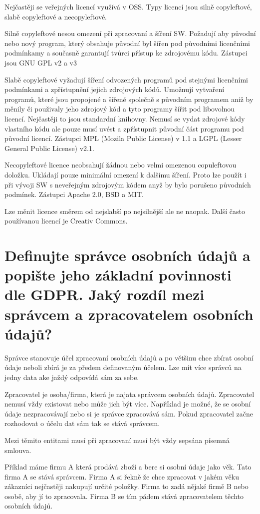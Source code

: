 \documentclass[12pt,a4paper,czech]{article}
\newcommand{\nadpis}[1]{{\section{#1}}}
\begin{document}
Nejčastěji se veřejných licencí využívá v OSS. Typy licencí jsou silně copyleftové, slabě copyleftové a necopyleftové.

Silně copyleftové nesou omezení při zpracovaní a šíření SW. Požadují aby původní nebo nový program, který obsahuje původní byl šířen pod původními licenčními podmínkamy a současně garantují tvůrci přístup ke zdrojovému kódu. Zástupci jsou GNU GPL v2 a v3

Slabě copyleftové vyžadují šíření odvozených programů pod stejnými licenčními podmínkami a zpřístupnění jejich zdrojových kódů. Umožnují vytvaření programů, které jsou propojené a šířené společně s původním programem aniž by měnily či použivaly jeho zdrojový kód a tyto programy šířit pod libovolnou licencí. Nejčastěji to jsou standardní knihovny. Nemusí se vydat zdrojové kódy vlastního kódu ale pouze musí uvést a zpřístupnit původní část programu pod původní licencí. Zástupci MPL (Mozila Public License) v 1.1 a  LGPL (Lesser General Public License) v2.1.

Necopyleftové licence neobsahují žádnou nebo velmi omezenou copuleftovou doložku. Ukládají pouze minimální omezení k dalšímu šíření. Proto lze použít i při vývoji SW s neveřejným zdrojovým kódem anyž by bylo porušeno původních podmínek. Zástupci Apache 2.0, BSD a MIT.

Lze měnit licence směrem od nejslabší po nejsilnější ale ne naopak. Další často používanou licencí je Creativ Commons.


\vspace{0.5cm} 
\nadpis{Definujte správce osobních údajů a popište jeho základní povinnosti dle GDPR. Jaký rozdíl mezi správcem a zpracovatelem osobních údajů?}

Správce stanovuje účel zpracovaní osobních údajů a po většinu chce zbírat osobní údaje neboli zbírá je za předem definovaným účelem. Lze mít více správců na jedny data ake jaždý odpovídá sám za sebe.

Zpracovatel je osoba/firma, která je najata správcem osobních údajů. Zpracovatel nemusí vždy existovat nebo může jich být více. Například je možné, že se osobní údaje nezpracovávají nebo si je správce zpracovává sám. Pokud zpracovatel začne rozhodovat o účelu dat sám tak se stává správcem.

Mezi těmito entitami musí při zpracovaní musí být vždy sepsána písemná smlouva.

Příklad máme firmu A která prodává zboží a bere si osobní údaje jako věk. Tato firma A se stává správcem. Firma A si řekně že chce zpracovat v jakém věku zákazníci nejčastěji nakupují určité položky. Firma to zadá nějaké firmě B nebo osobě, aby jí to zpracovala. Firma B se tím pádem stává zpracovatelem těchto osobních údajů.
\end{document}
